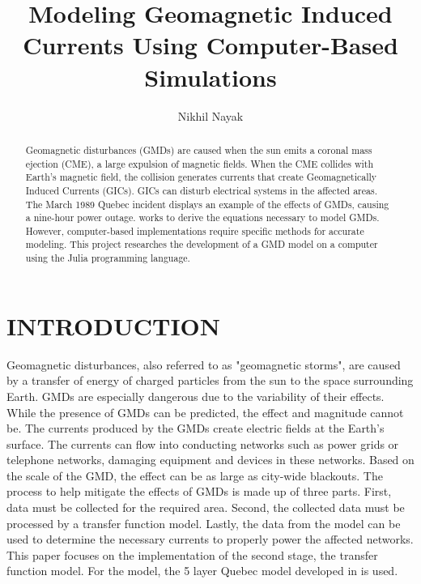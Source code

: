 \documentclass[letterpaper, 12 pt, conference]{ieeeconf}  %
\title{\LARGE \bf
Modeling Geomagnetic Induced Currents Using Computer-Based
Simulations
}
\author{Nikhil Nayak}
\begin{document}
\maketitle
\thispagestyle{empty}
\pagestyle{empty}


\begin{abstract}

Geomagnetic disturbances (GMDs) are caused when the sun emits a coronal mass ejection (CME), a large expulsion of magnetic fields. When the CME collides with Earth's magnetic field, the collision generates currents that create Geomagnetically Induced Currents (GICs). GICs can disturb electrical systems in the affected areas. The March 1989 Quebec incident displays an example of the effects of GMDs, causing a nine-hour power outage. \cite{8859181} works to derive the equations necessary to model GMDs. However, computer-based implementations require specific methods for accurate modeling. This project researches the development of a GMD model on a computer using the Julia programming language. 

\end{abstract}


\section{INTRODUCTION}

Geomagnetic disturbances, also referred to as "geomagnetic storms", are caused by a transfer of energy of charged particles from the sun to the space surrounding Earth. GMDs are especially dangerous due to the variability of their effects. While the presence of GMDs can be predicted, the effect and magnitude cannot be. The currents produced by the GMDs create electric fields at the Earth's surface. The currents can flow into conducting networks such as power grids or telephone networks, damaging equipment and devices in these networks. Based on the scale of the GMD, the effect can be as large as city-wide blackouts. The process to help mitigate the effects of GMDs is made up of three parts. First, data must be collected for the required area. Second, the collected data must be processed by a transfer function model. Lastly, the data from the model can be used to determine the necessary currents to properly power the affected networks. This paper focuses on the implementation of the second stage, the transfer function model. For the model, the 5 layer Quebec model developed in \cite{8859181} is used.
\end{document}
